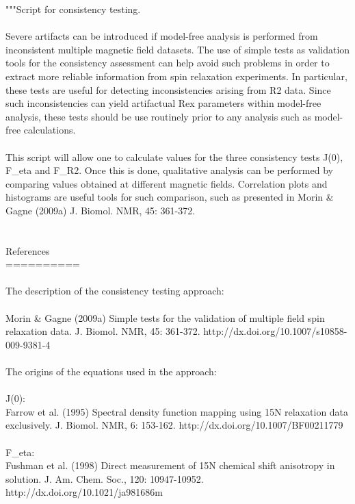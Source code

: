 \begin{exampleenv}
"""Script for consistency testing. \\
 \\
Severe artifacts can be introduced if model-free analysis is performed from inconsistent multiple magnetic field datasets. The use of simple tests as validation tools for the consistency assessment can help avoid such problems in order to extract more reliable information from spin relaxation experiments. In particular, these tests are useful for detecting inconsistencies arising from R2 data. Since such inconsistencies can yield artifactual Rex parameters within model-free analysis, these tests should be use routinely prior to any analysis such as model-free calculations. \\
 \\
This script will allow one to calculate values for the three consistency tests J(0), F\_eta and F\_R2. Once this is done, qualitative analysis can be performed by comparing values obtained at different magnetic fields. Correlation plots and histograms are useful tools for such comparison, such as presented in Morin \& Gagne (2009a) J. Biomol. NMR, 45: 361-372. \\
 \\
 \\
References \\
========== \\
 \\
The description of the consistency testing approach: \\
 \\
    Morin \& Gagne (2009a) Simple tests for the validation of multiple field spin relaxation data. J. Biomol. NMR, 45: 361-372. http://dx.doi.org/10.1007/s10858-009-9381-4 \\
 \\
The origins of the equations used in the approach: \\
 \\
    J(0): \\
        Farrow et al. (1995) Spectral density function mapping using 15N relaxation data exclusively. J. Biomol. NMR, 6: 153-162. http://dx.doi.org/10.1007/BF00211779 \\
 \\
    F\_eta: \\
        Fushman et al. (1998) Direct measurement of 15N chemical shift anisotropy in solution. J. Am. Chem. Soc., 120: 10947-10952. http://dx.doi.org/10.1021/ja981686m \\

\end{exampleenv}
